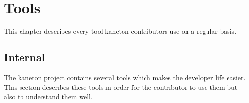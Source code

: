 %
%
%
%
%
%

%
%

\chapter{Tools}
\label{chapter:tools}

This chapter describes every tool kaneton contributors use on a regular-basis.

\newpage

%
%

%
%

\section{Internal}

The kaneton project contains several tools which makes the developer life
easier. This section describes these tools in order for the contributor to
use them but also to understand them well.





























